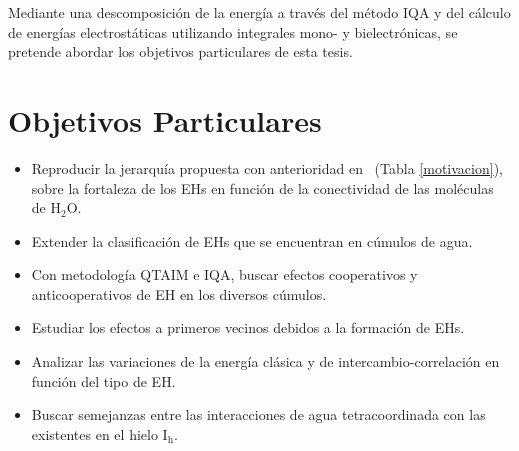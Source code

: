 Mediante una descomposición de la energía a través del método IQA y del cálculo
de energías electrostáticas utilizando integrales mono- y bielectrónicas, se
pretende abordar los objetivos particulares de esta tesis.

\section{Objetivos Particulares}

\begin{itemize}
\item Reproducir la jerarquía propuesta con anterioridad en~
(Tabla \ref{motivacion}), sobre la fortaleza de los EHs en función de la conectividad
de las moléculas de H$_2$O.
\item Extender la clasificación de EHs que se encuentran en cúmulos de agua.
\item Con metodología QTAIM e IQA, buscar efectos cooperativos y
anticooperativos de EH en los diversos cúmulos.
\item Estudiar los efectos a primeros vecinos debidos a la formación de EHs.
\item Analizar las variaciones de la energía clásica y de intercambio-correlación
en función del tipo de EH.
\item Buscar semejanzas entre las interacciones de agua tetracoordinada con
las existentes en el hielo $\mathrm{I_{h}}$.
\end{itemize}

